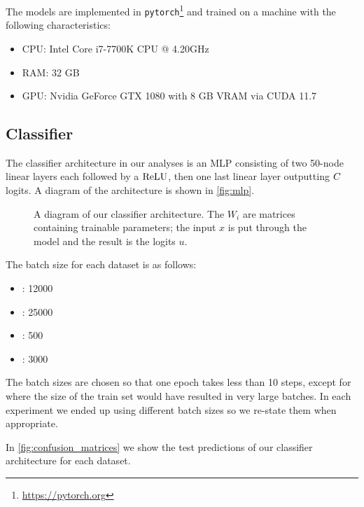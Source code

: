 \documentclass[../main.tex]{subfiles}
\begin{document}
The models are implemented in \texttt{pytorch}\footnote{\url{https://pytorch.org}} and trained on a machine with the following characteristics:
\begin{itemize}
    \item CPU: Intel Core i7-7700K CPU @ 4.20GHz
    \item RAM: 32 GB
    \item GPU: Nvidia GeForce GTX 1080 with 8 GB VRAM via CUDA 11.7
\end{itemize}

\subsection{Classifier}
\label{exp/classifiers}

The classifier architecture in our analyses is an MLP consisting of two 50-node linear layers each followed by a $\text{ReLU}$, then one last linear layer outputting $C$ logits.
A diagram of the architecture is shown in \autoref{fig:mlp}.
\begin{figure}[htbp]
	\centering
    
	\caption{A diagram of our classifier architecture. The $W_i$ are matrices containing trainable parameters; the input $x$ is put through the model and the result is the logits $u$.}
	\label{fig:mlp}
\end{figure}

The batch size for each dataset is as follows:
\begin{itemize}
    \item \CakeOnSea: 12000
    \item \ForestCover: 25000
    \item \WineQuality: 500
    \item \OnlineNewsPopularity: 3000
\end{itemize}
The batch sizes are chosen so that one epoch takes less than 10 steps, except for \ForestCover{} where the size of the train set would have resulted in very large batches.
In each experiment we ended up using different batch sizes so we re-state them when appropriate.

In \autoref{fig:confusion_matrices} we show the test predictions of our classifier architecture for each dataset.
\end{document}
